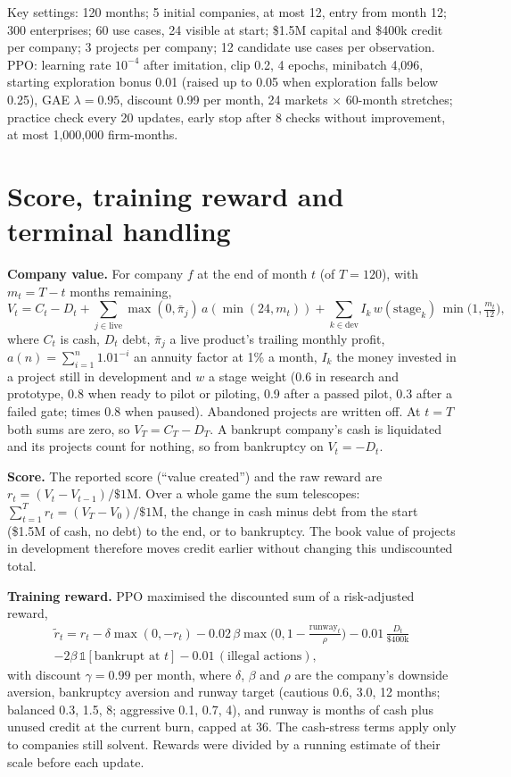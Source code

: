 \documentclass[11pt]{article}
\begin{document}
Key settings: 120 months; 5 initial companies, at most 12, entry from month 12; 300 enterprises; 60 use cases, 24 visible at start; \$1.5M capital and \$400k credit per company; 3 projects per company; 12 candidate use cases per observation. PPO: learning rate $10^{-4}$ after imitation, clip 0.2, 4 epochs, minibatch 4{,}096, starting exploration bonus 0.01 (raised up to 0.05 when exploration falls below 0.25), GAE $\lambda=0.95$, discount 0.99 per month, 24 markets $\times$ 60-month stretches; practice check every 20 updates, early stop after 8 checks without improvement, at most 1{,}000{,}000 firm-months.


\section{Score, training reward and terminal handling}
\label{app:reward}

\textbf{Company value.} For company $f$ at the end of month $t$ (of $T=120$), with $m_t = T - t$ months remaining,
\begin{equation}
V_t = C_t - D_t + \sum_{j\in\text{live}} \max(0,\bar\pi_j)\,a(\min(24,m_t)) + \sum_{k\in\text{dev}} I_k\, w(\text{stage}_k)\,\min\!\big(1,\tfrac{m_t}{12}\big),
\end{equation}
where $C_t$ is cash, $D_t$ debt, $\bar\pi_j$ a live product's trailing monthly profit, $a(n)=\sum_{i=1}^{n}1.01^{-i}$ an annuity factor at 1\% a month, $I_k$ the money invested in a project still in development and $w$ a stage weight (0.6 in research and prototype, 0.8 when ready to pilot or piloting, 0.9 after a passed pilot, 0.3 after a failed gate; times 0.8 when paused). Abandoned projects are written off. At $t=T$ both sums are zero, so $V_T = C_T - D_T$. A bankrupt company's cash is liquidated and its projects count for nothing, so from bankruptcy on $V_t = -D_t$.

\textbf{Score.} The reported score (``value created'') and the raw reward are $r_t = (V_t - V_{t-1})/\$1\text{M}$. Over a whole game the sum telescopes: $\sum_{t=1}^{T} r_t = (V_T - V_0)/\$1\text{M}$, the change in cash minus debt from the start (\$1.5M of cash, no debt) to the end, or to bankruptcy. The book value of projects in development therefore moves credit earlier without changing this undiscounted total.

\textbf{Training reward.} PPO maximised the discounted sum of a risk-adjusted reward,
\begin{multline}
\tilde r_t = r_t - \delta\max(0,-r_t) - 0.02\,\beta\max\!\Big(0, 1 - \tfrac{\text{runway}_t}{\rho}\Big) - 0.01\,\tfrac{D_t}{\$400\text{k}} \\
 - 2\beta\,\mathbb{1}[\text{bankrupt at } t] - 0.01\,(\text{illegal actions}),
\end{multline}
with discount $\gamma=0.99$ per month, where $\delta$, $\beta$ and $\rho$ are the company's downside aversion, bankruptcy aversion and runway target (cautious 0.6, 3.0, 12 months; balanced 0.3, 1.5, 8; aggressive 0.1, 0.7, 4), and runway is months of cash plus unused credit at the current burn, capped at 36. The cash-stress terms apply only to companies still solvent. Rewards were divided by a running estimate of their scale before each update.
\end{document}
